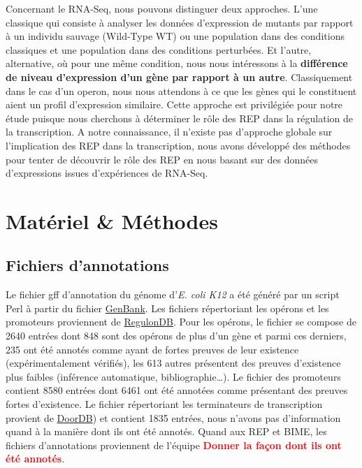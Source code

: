 \documentclass[12pt,a4paper]{report}
\begin{document}
\begin{onehalfspace}
Concernant le RNA-Seq, nous pouvons distinguer deux approches. L'une classique qui consiste à analyser les données d'expression de mutants par rapport à un individu sauvage (Wild-Type WT) ou une population dans des conditions classiques et une population dans des conditions perturbées. Et l'autre, alternative, où pour une même condition, nous nous intéressons à la \textbf{différence de niveau d'expression d'un gène par rapport à un autre}. Classiquement dans le cas d'un \gls{operon}, nous nous attendons à ce que les gènes qui le constituent aient un profil d'expression similaire. Cette approche est privilégiée pour notre étude puisque nous cherchons à déterminer le rôle des REP dans la régulation de la transcription.
A notre connaissance, il n'existe pas d'approche globale sur l'implication des REP dans la transcription, nous avons développé des méthodes pour tenter de découvrir le rôle des REP en nous basant sur des données d'expressions issues d'expériences de RNA-Seq.


\chapter*{Matériel \& Méthodes}

\section*{Fichiers d'annotations}
Le fichier \gls{gff} d'annotation du génome d'\textit{E. coli K12} a été généré par un script Perl à partir du fichier \href{http://www.ncbi.nlm.nih.gov/nuccore/NC_000913.2}{GenBank}. Les fichiers répertoriant les opérons et les promoteurs proviennent de \href{http://regulondb.ccg.unam.mx/}{RegulonDB}. Pour les opérons, le fichier se compose de 2640 entrées dont 848 sont des opérons de plus d'un gène et parmi ces derniers, 235 ont été annotés comme ayant de fortes preuves de leur existence (expérimentalement vérifiés), les 613 autres présentent des preuves d'existence plus faibles (inférence automatique, bibliographie\ldots). Le fichier des promoteurs contient 8580 entrées dont 6461 ont été annotées comme présentant des preuves fortes d'existence. Le fichier répertoriant les terminateurs de transcription provient de \href{http://csbl.bmb.uga.edu/DOOR/}{DoorDB}) et contient 1835 entrées, nous n'avons pas d'information quand à la manière dont ils ont été annotés. Quand aux REP et BIME, les fichiers d'annotations proviennent de l'équipe \textcolor{red}{\textbf{Donner la façon dont ils ont été annotés}}.


\end{onehalfspace}
\end{document}

